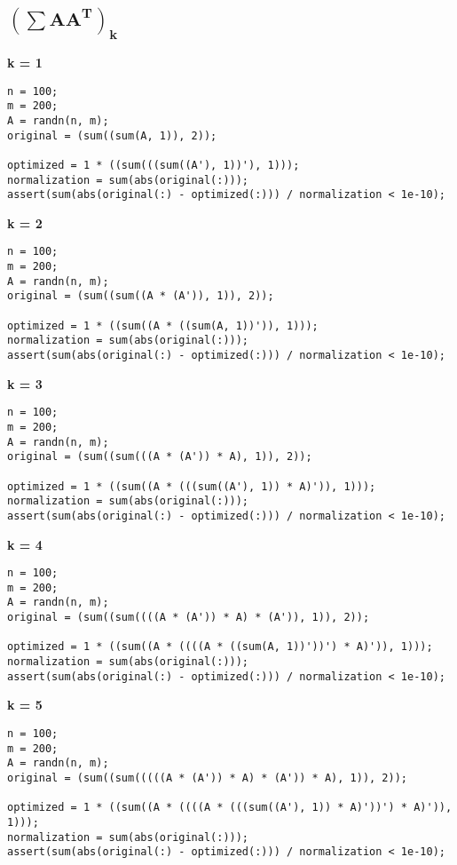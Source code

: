 

\subsection{$\mathbf{(\sum AA^T)_k}$}



{\bf k = 1}

\begin{lstlisting}
n = 100;
m = 200;
A = randn(n, m);
original = (sum((sum(A, 1)), 2));

optimized = 1 * ((sum(((sum((A'), 1))'), 1)));
normalization = sum(abs(original(:)));
assert(sum(abs(original(:) - optimized(:))) / normalization < 1e-10);
\end{lstlisting}


{\bf k = 2}

\begin{lstlisting}
n = 100;
m = 200;
A = randn(n, m);
original = (sum((sum((A * (A')), 1)), 2));

optimized = 1 * ((sum((A * ((sum(A, 1))')), 1)));
normalization = sum(abs(original(:)));
assert(sum(abs(original(:) - optimized(:))) / normalization < 1e-10);
\end{lstlisting}


{\bf k = 3}

\begin{lstlisting}
n = 100;
m = 200;
A = randn(n, m);
original = (sum((sum(((A * (A')) * A), 1)), 2));

optimized = 1 * ((sum((A * (((sum((A'), 1)) * A)')), 1)));
normalization = sum(abs(original(:)));
assert(sum(abs(original(:) - optimized(:))) / normalization < 1e-10);
\end{lstlisting}


{\bf k = 4}

\begin{lstlisting}
n = 100;
m = 200;
A = randn(n, m);
original = (sum((sum((((A * (A')) * A) * (A')), 1)), 2));

optimized = 1 * ((sum((A * ((((A * ((sum(A, 1))'))') * A)')), 1)));
normalization = sum(abs(original(:)));
assert(sum(abs(original(:) - optimized(:))) / normalization < 1e-10);
\end{lstlisting}


{\bf k = 5}

\begin{lstlisting}
n = 100;
m = 200;
A = randn(n, m);
original = (sum((sum(((((A * (A')) * A) * (A')) * A), 1)), 2));

optimized = 1 * ((sum((A * ((((A * (((sum((A'), 1)) * A)'))') * A)')), 1)));
normalization = sum(abs(original(:)));
assert(sum(abs(original(:) - optimized(:))) / normalization < 1e-10);
\end{lstlisting}


